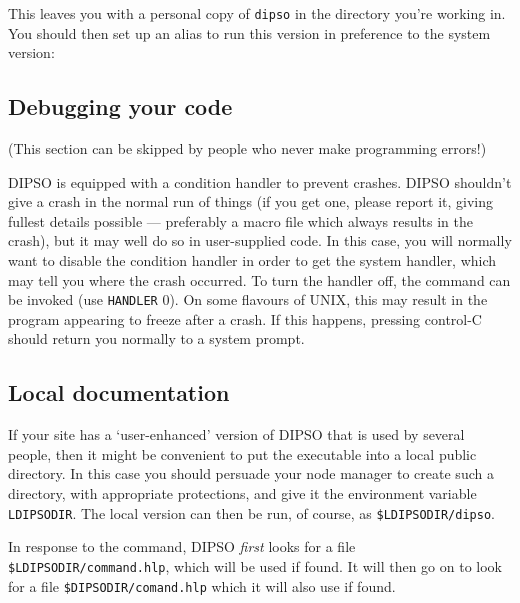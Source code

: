 \documentclass[twoside,11pt,noabs,nolof]{starlink}
\begin{document}
\begin{terminalv}
\end{terminalv}

This leaves you with a personal copy of {\texttt{dipso}}  in the directory you're
working in. You should then set up an alias to run this version in preference
to the system version:

\begin{terminalv}
\end{terminalv}

\subsection {Debugging your code}

(This section can be skipped by people who never make programming
errors!)

DIPSO is equipped with a condition handler to prevent crashes. DIPSO
shouldn't give a crash in the normal run of things (if you get one,
please report it, giving fullest details possible --- preferably a macro
file which always results in the crash), but it may well do so in
user-supplied code. In this case, you will normally want to disable the
condition handler in order to get the system handler, which may tell you
where the crash occurred. To turn the handler off, the 
command can be invoked (use {\texttt{HANDLER}  0}). On some flavours of UNIX,
this may result in the program appearing to freeze after a crash. If this
happens, pressing control-C should return you normally to a system
prompt.

\subsection {\label{SEC:LOC}Local documentation}

If your site has a `user-enhanced' version of DIPSO that is used by
several people, then it might be convenient to put the executable into a
local public directory. In this case you should persuade your node
manager to create such a directory, with appropriate protections, and
give it the environment variable {\texttt{LDIPSODIR}}.  The local version can
then be run, of course, as {\texttt{\$LDIPSODIR/dipso}}.

In response to the   command, DIPSO \emph{first} looks for a file {\texttt{\$LDIPSO\-DIR/command\-.hlp}},  which will be
used if found. It will then go on to look for a file \texttt{\$DIPSODIR/comand\-.hlp} which it will also use if found.
\end{document}
